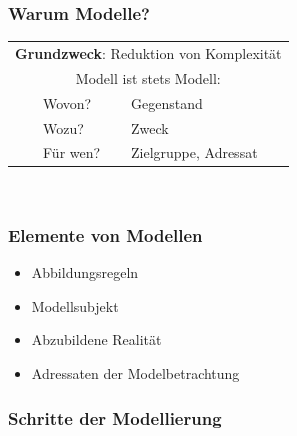 \documentclass[a4paper]{article}
\newcommand{\tabitem}{~~\llap{\textbullet}~~}
\begin{document}
			\subsubsection{Warum Modelle?}
			\centering
			\begin{tabular}{ll}
				\toprule
				\multicolumn{2}{c}{\textbf{Grundzweck}: Reduktion von Komplexität} \\[.5\normalbaselineskip]
				\multicolumn{2}{c}{Modell ist stets Modell:} \\
				\midrule
				\tabitem Wovon? & Gegenstand \\
				\tabitem Wozu? & Zweck \\
				\tabitem Für wen? & Zielgruppe, Adressat \\
				\bottomrule
			\end{tabular}
			\\[1\normalbaselineskip]
			
			\hrulefill
			
			\raggedright
			\subsubsection{Elemente von Modellen}
			\begin{itemize}
				\item Abbildungsregeln
				\item Modellsubjekt
				\item Abzubildene Realität
				\item Adressaten der Modelbetrachtung
			\end{itemize}
			\hrulefill
			
			\subsubsection{Schritte der Modellierung}
			
\end{document}
